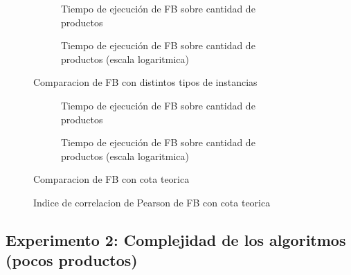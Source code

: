 \documentclass[10pt,a4paper]{article}
\begin{document}
\begin{figure}[H]
        \centering
        \begin{subfigure}{0.45\linewidth}
            \centering
            
            \caption{Tiempo de ejecución de FB sobre cantidad de productos}
            \label{fig:fb-comparacion-exp}
        \end{subfigure}
        \begin{subfigure}{0.45\linewidth}
            \centering
            
            \caption{Tiempo de ejecución de FB sobre cantidad de productos (escala logaritmica)}
            \label{fig:fb-comparacion-logaritmico}
        \end{subfigure}
        
    \caption{Comparacion de FB con distintos tipos de instancias}
    \label{fig:fb-comparacion}
    \end{figure}
    
\begin{figure}[H]
        \centering
        \begin{subfigure}{0.45\linewidth}
            \centering
            
            \caption{Tiempo de ejecución de FB sobre cantidad de productos}
            \label{fig:fb-comparacion-exp}
        \end{subfigure}
        \begin{subfigure}{0.45\linewidth}
            \centering
            
            \caption{Tiempo de ejecución de FB sobre cantidad de productos (escala logaritmica)}
            \label{fig:comparacion-logaritmico}
        \end{subfigure}
        
    \caption{Comparacion de FB con cota teorica}
    \label{fig:fb-comparacion-teorica}
    \end{figure}
    
\begin{figure}[!ht]
        \centering
        
\caption{Indice de correlacion de Pearson de FB con cota teorica}
\label{fig:fb-correlacion}
\end{figure}


\subsection{Experimento 2: Complejidad de los algoritmos (pocos productos)}
\end{document}
